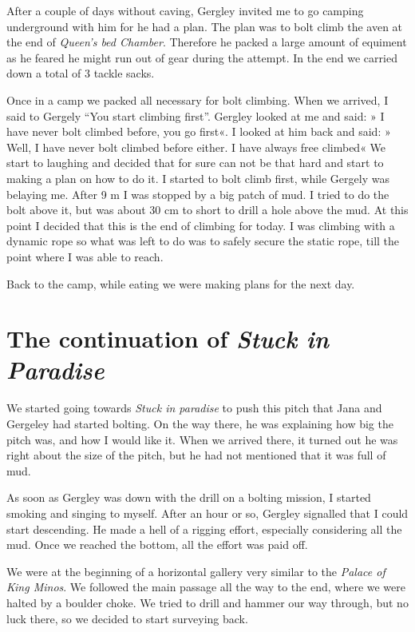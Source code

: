 After a couple of days without caving, Gergley invited me to go camping
underground with him for he had a plan. The plan was to bolt climb the
aven at the end of \emph{Queen's bed Chamber}. Therefore he packed a
large amount of equiment as he feared he might run out of gear during
the attempt. In the end we carried down a total of 3 tackle sacks.

Once in a camp we packed all necessary for bolt climbing. When we
arrived, I said to Gergely ``You start climbing first''. Gergley looked
at me and said: » I have never bolt climbed before, you go first«. I
looked at him back and said: » Well, I have never bolt climbed before
either. I have always free climbed« We start to laughing and decided
that for sure can not be that hard and start to making a plan on how to
do it. I started to bolt climb first, while Gergely was belaying me.
After 9 m I was stopped by a big patch of mud. I tried to do the bolt
above it, but was about 30 cm to short to drill a hole above the mud. At
this point I decided that this is the end of climbing for today. I was
climbing with a dynamic rope so what was left to do was to safely secure
the static rope, till the point where I was able to reach.

Back to the camp, while eating we were making plans for the next day.

\attrib{\izi}

\hypertarget{the-continuation-of-stuck-in-paradise}{%
\section{\texorpdfstring{The continuation of \emph{Stuck in
Paradise}}{The continuation of Stuck in Paradise}}\label{the-continuation-of-stuck-in-paradise}}

We started going towards \emph{Stuck in paradise} to push this pitch
that Jana and Gergeley had started bolting. On the way there, he was
explaining how big the pitch was, and how I would like it. When we
arrived there, it turned out he was right about the size of the pitch,
but he had not mentioned that it was full of mud.

As soon as Gergley was down with the drill on a bolting mission, I
started smoking and singing to myself. After an hour or so, Gergley
signalled that I could start descending. He made a hell of a rigging
effort, especially considering all the mud. Once we reached the bottom,
all the effort was paid off.

We were at the beginning of a horizontal gallery very similar to the
\emph{Palace of King Minos}. We followed the main passage all the way to
the end, where we were halted by a boulder choke. We tried to drill and
hammer our way through, but no luck there, so we decided to start
surveying back.


